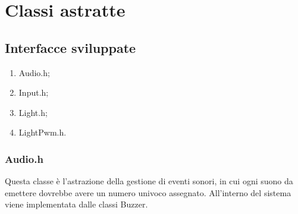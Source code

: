 \chapter{Classi astratte}
\section{Interfacce sviluppate}
\begin{enumerate}
	\item Audio.h;
	\item Input.h;
	\item Light.h;
	\item LightPwm.h.
\end{enumerate}

\subsection{Audio.h}
Questa classe è l'astrazione della gestione di eventi sonori, in cui ogni suono da emettere dovrebbe avere un numero univoco assegnato. All'interno del sistema viene implementata dalle classi Buzzer.
